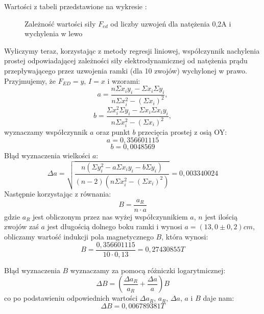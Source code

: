 \documentclass[10pt,a4paper]{article}
\newcommand{\forceindent}{\leavevmode{\parindent=3em\indent}}
\begin{document}
\forceindent Wartości z tabeli przedstawione na wykresie :

\begin{figure}[!h]
\centering
{}
\caption{Zależność wartości siły $F_{ed}$ od liczby uzwojeń dla natężenia 0,2A i wychylenia w lewo}
\end{figure}



\forceindent Wyliczymy teraz, korzystając z metody regresji liniowej, współczynnik nachylenia prostej odpowiadającej zależności siły elektrodynamicznej od natężenia prądu przepływającego przez uzwojenia ramki (dla 10 zwojów) wychylonej w prawo.\\
Przyjmujemy, że $F_{ED} = y$, $I = x$ i wzorami:
$$
a=\frac{n\Sigma x_i y_i - \Sigma x_i \Sigma y_i}{n\Sigma x_i^2 - (\Sigma x_i)^2},
$$
$$
b=\frac{\Sigma x_i^2 \Sigma y_i - \Sigma x_i \Sigma x_i y_i}{n \Sigma x_i^2 - (\Sigma x_i)^2},
$$
wyznaczamy współczynnik $a$ oraz punkt $b$ przecięcia prostej z osią OY:
$$
a = 0,356601115 
$$
$$
b = 0,0048569 
$$
Błąd wyznaczenia wielkości $a$:\\
$$ \Delta a = \sqrt{\frac{n(\Sigma y_i ^2 - a \Sigma x_i y_i - b\Sigma y_i)}{(n-2)(n \Sigma x_i ^2 - (\Sigma x_i)^2)}} = 0,003340024$$
Następnie korzystając z równania:
\begin{equation}
B = \frac{a_R}{n\cdot a}
\end{equation}
gdzie $a_R$ jest obliczonym przez nas wyżej współczynnikiem $a$, $n$ jest ilością zwojów zaś $a$ jest długością dolnego boku ramki i wynosi $a = (13,0 \pm 0,2) cm$,
obliczamy wartość indukcji pola magnetycznego $B$, która wynosi:
$$ B = \frac{0,356601115}{10\cdot 0,13} = 0,27430855 T $$

Błąd wyznaczenia $B$ wyznaczamy za pomocą różniczki logarytmicznej:
$$ \Delta B = \left ( \frac{\Delta a_R}{a_R} + \frac{\Delta a}{a}  \right ) B$$
co po podstawieniu odpowiednich wartości $\Delta a_R$, $a_R$, $\Delta a$, $a$ i $B$ daje nam:
$$ \Delta B = 0,006789381 T $$
\end{document}
